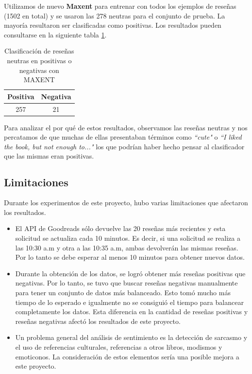\documentclass[hidelinks]{sig-alternate-05-2015}
\begin{document}
Utilizamos de nuevo \textbf{Maxent} para entrenar con todos los ejemplos de reseñas (1502 en total) y se usaron las 278 neutras para el conjunto de prueba. La mayoría resultaron ser clasificadas como positivas. Los resultados pueden consultarse en la siguiente tabla \ref{table:NEUTRAL}.

\begin{table}[H]
\centering
\caption{Clasificación de reseñas neutras en positivas o negativas con MAXENT}
\begin{tabular}{|c|c|} 	\hline
Positiva 	& Negativa 	\\ \hline
257 		& 21 		\\
\hline\end{tabular}
\label{table:NEUTRAL}
\end{table}

Para analizar el por qué de estos resultados, observamos las reseñas neutras y nos percatamos de que muchas de ellas presentaban términos como \textit{``cute"} o \textit{``I liked the book, but not enough to..."} los que podrían haber hecho pensar al clasificador que las mismas eran positivas.

\subsection{Limitaciones}

Durante los experimentos de este proyecto, hubo varias limitaciones que afectaron los resultados.
\begin{itemize}
\item El API de Goodreads sólo devuelve las 20 reseñas más recientes y esta solicitud se actualiza cada 10 minutos. Es decir, si una solicitud se realiza a las 10:30 a.m y otra a las 10:35 a.m, ambas devolverán las mismas reseñas. Por lo tanto se debe esperar al menos 10 minutos para obtener nuevos datos.
\item Durante la obtención de los datos, se logró obtener más reseñas positivas que negativas. Por lo tanto, se tuvo que buscar reseñas negativas manualmente para tener un conjunto de datos más balanceado. Esto tomó mucho más tiempo de lo esperado e igualmente no se consiguió el tiempo para balancear completamente los datos. Esta diferencia en la cantidad de reseñas positivas y reseñas negativas afectó los resultados de este proyecto.
\item Un problema general del análisis de sentimiento es la detección de sarcasmo y el uso de referencias culturales, referencias a otros libros, modismos y emoticonos. La consideración de estos elementos sería una posible mejora a este proyecto.
\end{itemize}
\vspace*{1\baselineskip}
\end{document}
